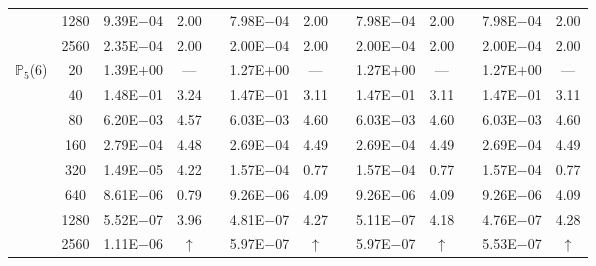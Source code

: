 \begin{table}[H]
{\begin{tabular}{@{}l c c c c c c c c c c c c@{}}
 & 1280 & 9.39E$-$04 & 2.00 &  & 7.98E$-$04 & 2.00 &  & 7.98E$-$04 & 2.00 &  & 7.98E$-$04 & 2.00\\
 & 2560 & 2.35E$-$04 & 2.00 &  & 2.00E$-$04 & 2.00 &  & 2.00E$-$04 & 2.00 &  & 2.00E$-$04 & 2.00\\
\midrule
\multirow{8}{*}{$\mathbb{P}_{5}$(6)}
 & 20 & 1.39E$+$00 & --- &  & 1.27E$+$00 & --- &  & 1.27E$+$00 & --- &  & 1.27E$+$00 & ---\\
 & 40 & 1.48E$-$01 & 3.24 &  & 1.47E$-$01 & 3.11 &  & 1.47E$-$01 & 3.11 &  & 1.47E$-$01 & 3.11\\
 & 80 & 6.20E$-$03 & 4.57 &  & 6.03E$-$03 & 4.60 &  & 6.03E$-$03 & 4.60 &  & 6.03E$-$03 & 4.60\\
 & 160 & 2.79E$-$04 & 4.48 &  & 2.69E$-$04 & 4.49 &  & 2.69E$-$04 & 4.49 &  & 2.69E$-$04 & 4.49\\
 & 320 & 1.49E$-$05 & 4.22 &  & 1.57E$-$04 & 0.77 &  & 1.57E$-$04 & 0.77 &  & 1.57E$-$04 & 0.77\\
 & 640 & 8.61E$-$06 & 0.79 &  & 9.26E$-$06 & 4.09 &  & 9.26E$-$06 & 4.09 &  & 9.26E$-$06 & 4.09\\
 & 1280 & 5.52E$-$07 & 3.96 &  & 4.81E$-$07 & 4.27 &  & 5.11E$-$07 & 4.18 &  & 4.76E$-$07 & 4.28\\
 & 2560 & 1.11E$-$06 & $\uparrow$ &  & 5.97E$-$07 & $\uparrow$ &  & 5.97E$-$07 & $\uparrow$ &  & 5.53E$-$07 & $\uparrow$\\
\bottomrule
\end{tabular}}
\label{PRO:bending:01_01_glob6_pro4}
\end{table}
